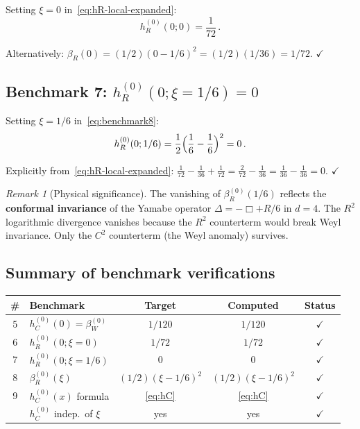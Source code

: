 \documentclass[11pt,a4paper]{article}
\theoremstyle{definition}
\theoremstyle{remark}
\newtheorem{remark}[theorem]{Remark}
\begin{document}
Setting $\xi = 0$ in~\eqref{eq:hR-local-expanded}:
\begin{equation}
  h_R^{(0)}(0;0) = \frac{1}{72}\,.
  \label{eq:benchmark6}
\end{equation}

Alternatively: $\beta_R(0) = (1/2)(0 - 1/6)^2 = (1/2)(1/36) = 1/72$.
\quad$\checkmark$


\subsection{Benchmark 7: $h_R^{(0)}(0;\xi=1/6) = 0$}

Setting $\xi = 1/6$ in~\eqref{eq:benchmark8}:
\begin{equation}
  h_R^{(0)}(0;1/6) = \frac{1}{2}\Bigl(\frac{1}{6} - \frac{1}{6}\Bigr)^2
  = 0\,.
  \label{eq:benchmark7}
\end{equation}

Explicitly from~\eqref{eq:hR-local-expanded}:
$\frac{1}{72} - \frac{1}{36} + \frac{1}{72}
= \frac{2}{72} - \frac{1}{36} = \frac{1}{36} - \frac{1}{36} = 0$.
\quad$\checkmark$

\begin{remark}[Physical significance]
The vanishing of $\beta_R^{(0)}(1/6)$ reflects the
\textbf{conformal invariance} of the Yamabe operator
$\Delta = -\Box + R/6$ in $d = 4$.  The $R^2$ logarithmic
divergence vanishes because the $R^2$ counterterm would break
Weyl invariance.  Only the $C^2$ counterterm (the Weyl anomaly)
survives.
\end{remark}


\subsection{Summary of benchmark verifications}

\begin{center}
\renewcommand{\arraystretch}{1.4}
\begin{tabular}{clccc}
\toprule
\textbf{\#} & \textbf{Benchmark} & \textbf{Target} & \textbf{Computed} & \textbf{Status} \\
\midrule
5 & $h_C^{(0)}(0) = \beta_W^{(0)}$ & $1/120$ & $1/120$ & $\checkmark$ \\
6 & $h_R^{(0)}(0;\xi=0)$ & $1/72$ & $1/72$ & $\checkmark$ \\
7 & $h_R^{(0)}(0;\xi=1/6)$ & $0$ & $0$ & $\checkmark$ \\
8 & $\beta_R^{(0)}(\xi)$ & $(1/2)(\xi-1/6)^2$ & $(1/2)(\xi-1/6)^2$ & $\checkmark$ \\
9 & $h_C^{(0)}(x)$ formula & \eqref{eq:hC} & \eqref{eq:hC} & $\checkmark$ \\
& $h_C^{(0)}$ indep.\ of $\xi$ & yes & yes & $\checkmark$ \\
\bottomrule
\end{tabular}
\end{center}
\end{document}
